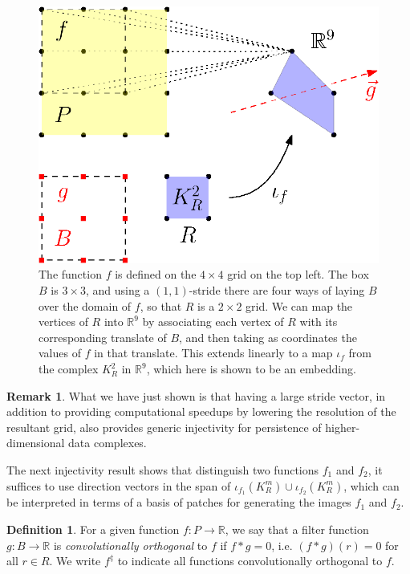 \documentclass[conference]{IEEEtran}
\theoremstyle{definition}
\newtheorem{definition}[theorem]{Definition}
\numberwithin{figure}{section}
\newtheorem{remark}[theorem]{Remark}
\begin{document}
	
\begin{figure}
	\includegraphics{embedding}
	\caption{The function $f$ is defined on the $4 \times 4$ grid on the top left. The box $B$ is $3 \times 3$, and using a $(1,1)$-stride there are four ways of laying $B$ over the domain of $f$, so that $R$ is a $2 \times 2$ grid. We can map the vertices of $R$ into $\mathbb{R}^9$ by associating each vertex of $R$ with its corresponding translate of $B$, and then taking as coordinates the values of $f$ in that translate. This extends linearly to a map $\iota_{f}$ from the complex $K_{R}^2$ in $\mathbb{R}^9$, which here is shown to be an embedding.}
	\label{fig:embedding}
\end{figure}

\begin{remark}
	What we have just shown is that having a large stride vector, in addition to providing computational speedups by lowering the resolution of the resultant grid, also provides generic injectivity for persistence of higher-dimensional data complexes.
\end{remark}

The next injectivity result shows that distinguish two functions $f_1$ and $f_2$, it suffices to use direction vectors in the span of $\iota_{f_1}(K_R^m) \cup \iota_{f_2}(K_R^m)$, which can be interpreted in terms of a basis of patches for generating the images $f_1$ and $f_2$.

\begin{definition}
	For a given function $f:P \to \mathbb{R}$, we say that a filter function $g:B \to \mathbb{R}$ is \emph{convolutionally orthogonal} to $f$ if $f \ast g = 0$, i.e. $(f \ast g)(r) = 0$ for all $r \in R$. We write $f^{\ddagger}$ to indicate all functions convolutionally orthogonal to $f$.
\end{definition}
\end{document}
